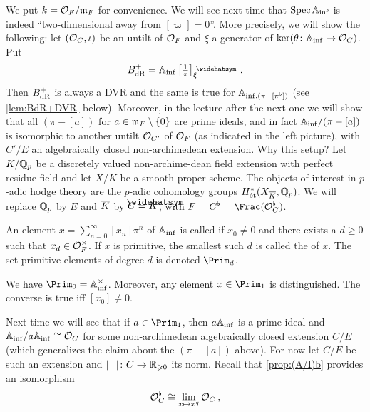 We put $k=\mathcal{O}_F/\mathfrak{m}_F$ for convenience. We will see next time that $\operatorname{Spec}\mathbb{A}_{\mathrm{inf}}$ is indeed \enquote{two-dimensional away from $[\varpi]=0$}. More precisely, we will show the following: let $(\mathcal{O}_C,\iota)$ be an untilt of $\mathcal{O}_F$ and $\xi$ a generator of $\ker(\theta\colon \IA_\inf\morphism \Oo_C)$. Put
\begin{equation*}
	B_\dR^+=\IA_\inf\left[\textstyle \frac 1\pi\right]_\xi^\complete\,.
\end{equation*}
Then $B_{\mathrm{dR}}^+$ is always a DVR and the same is true for $\mathbb{A}_{\mathrm{inf},(\pi-[\pi^\flat])}$ (see \cref{lem:BdR+DVR} below). Moreover, in the lecture after the next one we will show that all $(\pi-[a])$ for $a\in\mathfrak{m}_F\setminus\{0\}$ are prime ideals, and in fact $\mathbb{A}_{\mathrm{inf}}/(\pi-[a])$ is isomorphic to another untilt $\mathcal{O}_{C'}$ of $\mathcal{O}_F$ (as indicated in the left picture), with $C'/E$ an algebraically closed non-archimedean extension.
Why this setup? Let $K/\mathbb{Q}_p$ be a discretely valued non-archime-dean field extension with perfect residue field and let $X/K$ be a smooth proper scheme.  The objects of interest in $p$-adic hodge theory are the $p$-adic cohomology groups $H_\et^*(X_{\ov{K}},\IQ_p)$. We will replace $\mathbb{Q}_p$ by $E$ and $\ov{K}$ by $C=\roof{\ov{K}}$, with $F=C^\flat=\Frac(\Oo_C^\flat)$.
\begin{defi}
	An element $x=\sum_{n=0}^\infty [x_n]\pi^n$ of $\mathbb{A}_{\mathrm{inf}}$ is called  if $x_0\neq 0$ and there exists a $d\geq 0$ such that $x_d\in \mathcal{O}_F^\times$. If $x$ is primitive, the smallest such $d$ is called the  of $x$. The set primitive elements of degree $d$ is denoted $\Prim_d$.
\end{defi}
\begin{exm}
	We have $\Prim_0=\IA_\inf^\times$. Moreover, any element $x\in \Prim_1$ is distinguished. The converse is true iff $[x_0]\neq 0$.
\end{exm}
Next time we will see that if $a\in \Prim_1$, then $a\mathbb{A}_{\mathrm{inf}}$ is  a prime ideal and $\mathbb{A}_{\mathrm{inf}}/a\mathbb{A}_{\mathrm{inf}}\cong \mathcal{O}_C$ for some non-archimedean algebraically closed extension $C/E$ (which generalizes the claim about the $(\pi-[a])$ above). For now let $C/E$ be such an extension and $|\blank|\colon C\morphism \IR_{\geq 0}$ its norm. Recall that \cref{prop:(A/I)b} provides an isomorphism
\begin{equation*}
	\mathcal{O}_C^\flat\cong \operatorname*{lim}_{x\mapsto x^q}\mathcal{O}_C\,,
\end{equation*}
